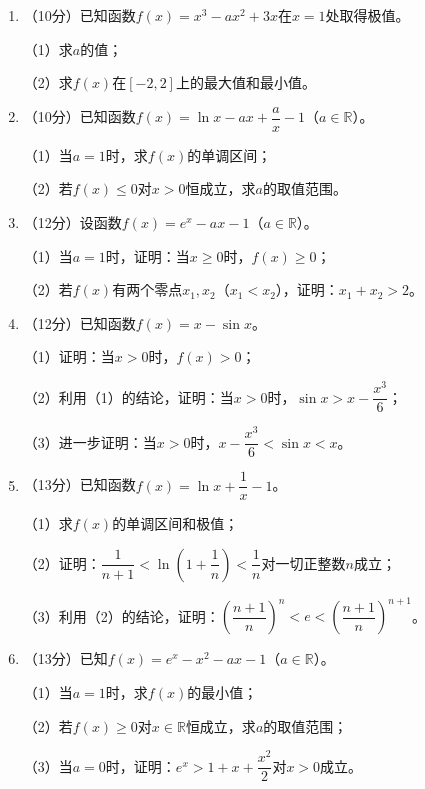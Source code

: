 \documentclass[12pt, a4paper]{ctexart}
\begin{document}
\begin{enumerate}[start=17]
\item （10分）已知函数$f(x)=x^3-ax^2+3x$在$x=1$处取得极值。

（1）求$a$的值；

（2）求$f(x)$在$[-2,2]$上的最大值和最小值。

\item （10分）已知函数$f(x)=\ln x-ax+\dfrac{a}{x}-1$（$a\in\mathbb{R}$）。

（1）当$a=1$时，求$f(x)$的单调区间；

（2）若$f(x)\leq 0$对$x>0$恒成立，求$a$的取值范围。

\item （12分）设函数$f(x)=e^x-ax-1$（$a\in\mathbb{R}$）。

（1）当$a=1$时，证明：当$x\geq 0$时，$f(x)\geq 0$；

（2）若$f(x)$有两个零点$x_1,x_2$（$x_1<x_2$），证明：$x_1+x_2>2$。

\item （12分）已知函数$f(x)=x-\sin x$。

（1）证明：当$x>0$时，$f(x)>0$；

（2）利用（1）的结论，证明：当$x>0$时，$\sin x > x-\dfrac{x^3}{6}$；

（3）进一步证明：当$x>0$时，$x-\dfrac{x^3}{6} < \sin x < x$。

\item （13分）已知函数$f(x)=\ln x+\dfrac{1}{x}-1$。

（1）求$f(x)$的单调区间和极值；

（2）证明：$\dfrac{1}{n+1} < \ln\left(1+\dfrac{1}{n}\right) < \dfrac{1}{n}$对一切正整数$n$成立；

（3）利用（2）的结论，证明：$\left(\dfrac{n+1}{n}\right)^n < e < \left(\dfrac{n+1}{n}\right)^{n+1}$。

\item （13分）已知$f(x)=e^x-x^2-ax-1$（$a\in\mathbb{R}$）。

（1）当$a=1$时，求$f(x)$的最小值；

（2）若$f(x)\geq 0$对$x\in\mathbb{R}$恒成立，求$a$的取值范围；

（3）当$a=0$时，证明：$e^x > 1+x+\dfrac{x^2}{2}$对$x>0$成立。
\end{enumerate}
\end{document}
